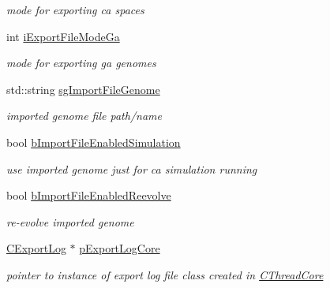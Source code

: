 \begin{DoxyCompactItemize}
\begin{DoxyCompactList}\small\item\em mode for exporting ca spaces \item\end{DoxyCompactList}\item 
\hypertarget{classCConfigCore_abb8b60e7b7a3b288ec22a7966e3fc1aa}{
int \hyperlink{classCConfigCore_abb8b60e7b7a3b288ec22a7966e3fc1aa}{iExportFileModeGa}}
\label{classCConfigCore_abb8b60e7b7a3b288ec22a7966e3fc1aa}

\begin{DoxyCompactList}\small\item\em mode for exporting ga genomes \item\end{DoxyCompactList}\item 
\hypertarget{classCConfigCore_abb1f2a7e873eafd18da24a3c285f96f2}{
std::string \hyperlink{classCConfigCore_abb1f2a7e873eafd18da24a3c285f96f2}{sgImportFileGenome}}
\label{classCConfigCore_abb1f2a7e873eafd18da24a3c285f96f2}

\begin{DoxyCompactList}\small\item\em imported genome file path/name \item\end{DoxyCompactList}\item 
\hypertarget{classCConfigCore_a19e42569fbdaf37b78051b9b6f4c2090}{
bool \hyperlink{classCConfigCore_a19e42569fbdaf37b78051b9b6f4c2090}{bImportFileEnabledSimulation}}
\label{classCConfigCore_a19e42569fbdaf37b78051b9b6f4c2090}

\begin{DoxyCompactList}\small\item\em use imported genome just for ca simulation running \item\end{DoxyCompactList}\item 
\hypertarget{classCConfigCore_a6040713bcfc41a177139ddd0c3ba17d5}{
bool \hyperlink{classCConfigCore_a6040713bcfc41a177139ddd0c3ba17d5}{bImportFileEnabledReevolve}}
\label{classCConfigCore_a6040713bcfc41a177139ddd0c3ba17d5}

\begin{DoxyCompactList}\small\item\em re-\/evolve imported genome \item\end{DoxyCompactList}\item 
\hypertarget{classCConfigCore_ab5dc25bcfe91941e290a2c9537d3e585}{
\hyperlink{classCExportLog}{CExportLog} $\ast$ \hyperlink{classCConfigCore_ab5dc25bcfe91941e290a2c9537d3e585}{pExportLogCore}}
\label{classCConfigCore_ab5dc25bcfe91941e290a2c9537d3e585}

\begin{DoxyCompactList}\small\item\em pointer to instance of export log file class created in \hyperlink{classCThreadCore}{CThreadCore} \item\end{DoxyCompactList}\end{DoxyCompactItemize}


